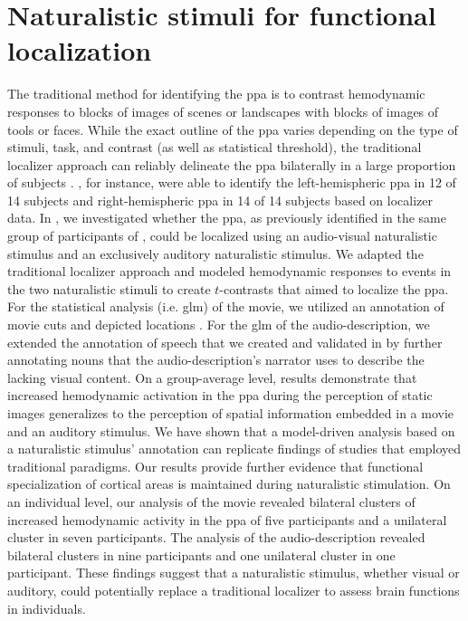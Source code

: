 \section{Naturalistic stimuli for functional localization}

%
The traditional method for identifying the \ac{ppa} is to contrast hemodynamic
responses to blocks of images of scenes or landscapes with blocks of images of
tools or faces.
%
While the exact outline of the \ac{ppa} varies depending on the type of stimuli,
task, and contrast (as well as statistical threshold), the traditional localizer
approach can reliably delineate the \ac{ppa} bilaterally in a large proportion
of subjects \citep{zhen2017quantifying}.
%
\citet{sengupta2016extension}, for instance, were able to identify the
left-hemispheric \ac{ppa} in 12 of 14 subjects and right-hemispheric \ac{ppa} in
14 of 14 subjects based on localizer data.
In \citet{haeusler2022processing}, we investigated whether the \ac{ppa}, as
previously identified in the same group of participants of
\citet{sengupta2016extension}, could be localized using an audio-visual
naturalistic stimulus and an exclusively auditory naturalistic stimulus.
We adapted the traditional localizer approach and modeled hemodynamic responses
to events in the two naturalistic stimuli to create $t$-contrasts that aimed to
localize the \ac{ppa}.
For the statistical analysis (i.e. \ac{glm}) of the movie, we utilized an
annotation of movie cuts and depicted locations \citep{haeusler2016cutanno}.
For the \ac{glm} of the audio-description, we extended the annotation of speech
that we created and validated in \citet{haeusler2021speechanno} by further
annotating nouns that the audio-description's narrator uses to describe the
lacking visual content.
On a group-average level, results demonstrate that increased hemodynamic
activation in the \ac{ppa} during the perception of static images generalizes to
the perception of spatial information embedded in a movie and an auditory
stimulus.
%
We have shown that a model-driven analysis based on a naturalistic
stimulus' annotation can replicate findings of studies that employed traditional
paradigms.
%
Our results provide further evidence \citep[cf.][]{bartels2004mapping} that
functional specialization of cortical areas is maintained during naturalistic
stimulation.
On an individual level, our analysis of the movie revealed bilateral clusters of
increased hemodynamic activity in the \ac{ppa} of five participants and a
unilateral cluster in seven participants.
%
The analysis of the audio-description revealed bilateral clusters in nine
participants and one unilateral cluster in one participant.
These findings suggest that a naturalistic stimulus, whether visual or auditory,
could potentially replace a traditional localizer to assess brain functions in
individuals.




